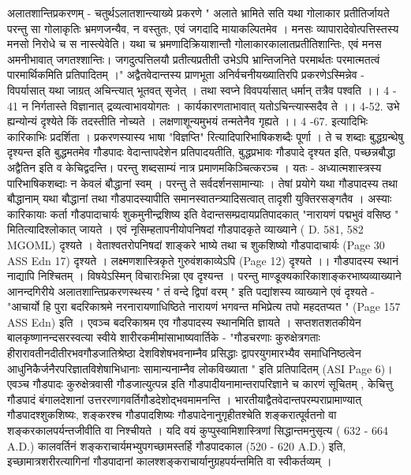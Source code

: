 अलातशान्तिप्रकरणम् - 
चतुर्थऽलातशान्त्याख्ये प्रकरणे " अलाते भ्रामिते सति यथा गोलाकार प्रतीतिर्जायते परन्तु सा गोलाकृतिः भ्रमणजन्यैव, न वस्तुतः, एवं जगदादि मायाकल्पितमेव । मनसः व्यापारादेवोत्पत्तिस्तस्य मनसो निरोधे च स नास्त्येवेति। यथा च भ्रमणादिक्रियाशान्तौ गोलाकारकालातप्रतीतिशान्तिः, एवं मनस अमनीभावात् जगतश्शान्तिः। जगदुत्पत्तिलयौ प्रतीत्यप्रतीती उभेऽपि भ्रान्तिजनिते परमार्थतः परमात्मतत्वं पारमार्थिकमिति प्रतिपादितम् ।"
अद्वैतवेदान्तस्य प्राणभूता अनिर्वचनीयख्यातिरपि प्रकरणेऽस्मिन्नेव -
विपर्यासात् यथा जाग्रत् अचिन्त्यात् भूतवत् सृजेत् । 
तथा स्वप्ने विवपर्यासात् धर्मान् तत्रैव पश्वति ।। 4 - 41 
न निर्गतास्ते विज्ञानात् द्रव्यत्वाभावयोगतः ।
कार्यकारणताभावात् यतोऽचिन्त्यास्सदैव ते ।। 4-52. 
उभे ह्यन्योन्यं दृश्येते किं तदस्तीति नोच्यते । 
लक्षणाशून्यमुभयं तन्मतेनैव गृह्यते ।।  4 -67.
इत्यादिभिः कारिकाभिः प्रदर्शिता । 
प्रकरणस्यास्य भाषा "विज्ञप्ति" रित्यादिपारिभाषिकशब्दैः पूर्णा । ते च शब्दाः बुद्धग्रन्थेषु दृश्यन्त इति बुद्धमतमेव गौडपादः वेदान्तापदेशेन प्रतिपादयतीति, बुद्धप्रभावः गौडपादे दृश्यत इति, पच्छन्नबौद्धा अद्वैतिन इति व केचिद्वदन्ति। 
परन्तु शब्दसाम्यं नात्र प्रमाणमकिञ्चित्करञ्च । यतः - अध्यात्मशास्त्रस्य पारिभाषिकशब्दाः न केवलं बौद्धानां स्वम् । परन्तु ते सर्वदर्शनसामान्याः । तेषां प्रयोगे यथा गौडपादस्य तथा बौद्धानाम् यथा बौद्धानां तथा गौडपादस्यापीति समानस्वातन्त्र्यादिसत्वात् तादृशी युक्तिरसङ्गतैव । 
अस्याः कारिकायाः कर्ता गौडपादाचार्यः शुकमुनीन्द्रशिष्य इति वेदान्तसम्प्रदायप्रतिपादकात् "नारायणं पद्मभुवं वसिष्ठ " मितित्यादिश्लोकात् जायते । एवं नृसिम्हतापनीयोपनिषदां गौडपादकृते व्याख्याने ( D. 581, 582 MGOML)  दृश्यते । वेताश्वतरोपनिषदां शाङ्करे भाष्ये तथा च शुकशिष्यो गौडपादाचार्यः (Page 30 ASS Edn 17) दृश्यते । लक्ष्मणशास्त्रिकृते गुरुवंशकाव्येऽपि (Page 12) दृश्यते ।। 
गौडपादस्य स्थानं नाद्यापि निश्चितम् । विषयेऽस्मिन् विचाराःभिन्ना एव दृश्यन्त । परन्तु माण्डूक्यकारिकाशाङ्करभाष्यव्याख्याने आनन्दगिरीये अलातशान्तिप्रकरणस्थस्य " तं वन्दे द्विपां वरम् " इति पद्यांशस्य व्याख्याने एवं दृश्यते -
"आचार्यो हि पुरा बदरिकाश्रमे नरनारायणाधिष्ठिते नारायणं भगवन्त मभिप्रेत्य तपो महदतप्यत " (Page 157 ASS Edn) इति । एवञ्च बदरिकाश्रम एव गौडपादस्य स्थानमिति ज्ञायते । 
सप्तशतशतकीयेन बालकृष्णानन्दसरस्वत्या स्वीये शारीरकमीमांसाभाष्यवार्तिके - 
"गौडचरणाः कुरुक्षेत्रगताः हीरारावतीनदीतीरभवगौडजातिश्रेष्ठा देशविशेषभवनाम्नैव प्रसिद्धाः द्वापरयुगमारभ्यैव समाधिनिष्ठत्वेन आधुनिकैर्जनैरपरिज्ञातविशेषाभिधानाः सामान्यनाम्नैव लोकविख्याता " इति प्रतिपादितम् (ASI Page 6)। एवञ्च गौडपादः कुरुक्षेत्रवासी गौडजात्युत्पन्न इति गौडपादीयनामान्तरापरिज्ञाने च कारणं सूचितम् , केचित्तु गौडपादं बंगालदेशानां उत्तररणागवर्तिगौडदेशोद्भवमामनन्ति । 
भारतीयाद्वैतवेदान्तपरम्पराप्रामाण्यात् गौडपादश्शुकशिष्यः, शङ्करश्च गौडपादशिष्यः गौडपादेनानुगृहीतश्चेति शङ्करात्पूर्वतनो वा शङ्करकालपर्यन्तजीवीति वा निश्चीयते । यदि वयं कुप्पुस्वामिशास्त्रिणां सिद्धान्तमनुसृत्य ( 632 - 664 A.D.) कालवर्तिनं शङ्कराचार्यमभ्युपगच्छामस्तर्हि गौडपादकाल (520 - 620 A.D.) इति, इच्छामात्रशरीरत्यागिनां गौडपादानां कालश्शङ्कराचार्यानुग्रहपर्यन्तमिति वा स्वीकर्तव्यम् । 
